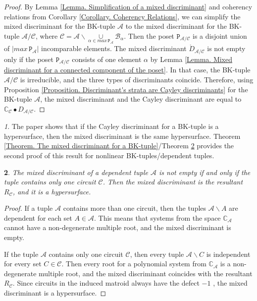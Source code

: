 \documentclass[11pt]{article}
\theoremstyle{plain}
\newtheorem{thm}{\protect\theoremname}[section]
\theoremstyle{definition}
\theoremstyle{remark}
\newtheorem{rem}[thm]{\protect\remarkname}
\theoremstyle{plain}
\theoremstyle{plain}
\theoremstyle{plain}
\theoremstyle{definition}
\providecommand{\remarkname}{Remark}
\providecommand{\theoremname}{Theorem}
\begin{document}
\begin{proof}
By Lemma \ref{Lemma. Simplification of a mixed discriminant} and
coherency relations from Corollary \ref{Corollary. Coherency Relations},
we can simplify the mixed discriminant for the BK-tuple $\mathscr{A}$
to the mixed discriminant for the BK-tuple $\mathscr{A}/\mathscr{C}$,
where $\mathscr{C}=\mathscr{A}\backslash\underset{\alpha\in max\,\mathtt{P}_{\mathscr{A}}}{\cup}\mathscr{B}_{\alpha}$.
Then the poset $\mathtt{P}_{\mathscr{A}/\mathscr{C}}$ is a disjoint
union of $|max\,\mathtt{P}_{\mathscr{A}}|$ incomparable elements.
The mixed discriminant $\mathring{D}_{\mathscr{A}/\mathscr{C}}$ is
not empty only if the poset $\mathtt{P}_{\mathscr{A}/\mathscr{C}}$
consists of one element $\alpha$ by Lemma \ref{Lemma. Mixed discriminant for a connected component of the poset}.
In that case, the BK-tuple $\mathscr{A}/\mathscr{C}$ is irreducible,
and the three types of discriminants coincide. Therefore, using Proposition
\ref{Proposition. Discriminant's strata are Cayley discriminants}
for the BK-tuple $\mathscr{A}$, the mixed discriminant and the Cayley
discriminant are equal to $\mathbb{C}_{\mathscr{C}}\bullet D_{\mathscr{A}/\mathscr{C}}$.
\end{proof}
\begin{rem}
The paper \cite{cattani_mixed_2013} shows that if the Cayley discriminant
for a BK-tuple is a hypersurface, then the mixed discriminant is the
same hypersurface. Theorem \ref{Theorem. The mixed discriminant for a BK-tuple}/Theorem
\ref{Theorem. The mixed discriminant for a linearly dependent tuple}
provides the second proof of this result for nonlinear BK-tuples/dependent
tuples.
\end{rem}

\begin{thm}
\label{Theorem. The mixed discriminant for a linearly dependent tuple}The
mixed discriminant of a dependent tuple $\mathscr{A}$ is not empty
if and only if the tuple contains only one circuit $\mathscr{C}$.
Then the mixed discriminant is the resultant $R_{\mathscr{C}}$, and
it is a hypersurface.
\end{thm}

\begin{proof}
If a tuple $\mathscr{A}$ contains more than one circuit, then the
tuples $\mathscr{A}\backslash A$ are dependent for each set $A\in\mathscr{A}$.
This means that systems from the space $\mathbb{C}_{\mathscr{A}}$
cannot have a non-degenerate multiple root, and the mixed discriminant
is empty.

If the tuple $\mathscr{A}$ contains only one circuit $\mathscr{C}$,
then every tuple $\mathscr{A}\backslash C$ is independent for every
set $C\in\mathscr{C}$. Then every root for a polynomial system from
$\mathbb{C}_{\mathscr{A}}$ is a non-degenerate multiple root, and
the mixed discriminant coincides with the resultant $R_{\mathscr{C}}$.
Since circuits in the induced matroid always have the defect $-1$
\cite{pokidkin_combinatorics_2025}, the mixed discriminant is a hypersurface.
\end{proof}
\end{document}
